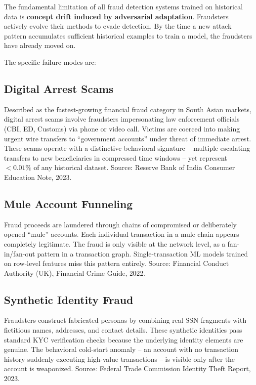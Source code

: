 \documentclass[12pt,a4paper,oneside]{book}
\begin{document}
The fundamental limitation of all fraud detection systems trained on historical data is \textbf{concept drift induced by adversarial adaptation}. Fraudsters actively evolve their methods to evade detection. By the time a new attack pattern accumulates sufficient historical examples to train a model, the fraudsters have already moved on.

The specific failure modes are:

\subsection*{Digital Arrest Scams}

Described as the fastest-growing financial fraud category in South Asian markets, digital arrest scams involve fraudsters impersonating law enforcement officials (CBI, ED, Customs) via phone or video call. Victims are coerced into making urgent wire transfers to ``government accounts'' under threat of immediate arrest. These scams operate with a distinctive behavioral signature -- multiple escalating transfers to new beneficiaries in compressed time windows -- yet represent $<0.01\%$ of any historical dataset. Source: Reserve Bank of India Consumer Education Note, 2023.

\subsection*{Mule Account Funneling}

Fraud proceeds are laundered through chains of compromised or deliberately opened ``mule'' accounts. Each individual transaction in a mule chain appears completely legitimate. The fraud is only visible at the network level, as a fan-in/fan-out pattern in a transaction graph. Single-transaction ML models trained on row-level features miss this pattern entirely. Source: Financial Conduct Authority (UK), Financial Crime Guide, 2022.

\subsection*{Synthetic Identity Fraud}

Fraudsters construct fabricated personas by combining real SSN fragments with fictitious names, addresses, and contact details. These synthetic identities pass standard KYC verification checks because the underlying identity elements are genuine. The behavioral cold-start anomaly -- an account with no transaction history suddenly executing high-value transactions -- is visible only after the account is weaponized. Source: Federal Trade Commission Identity Theft Report, 2023.
\end{document}
